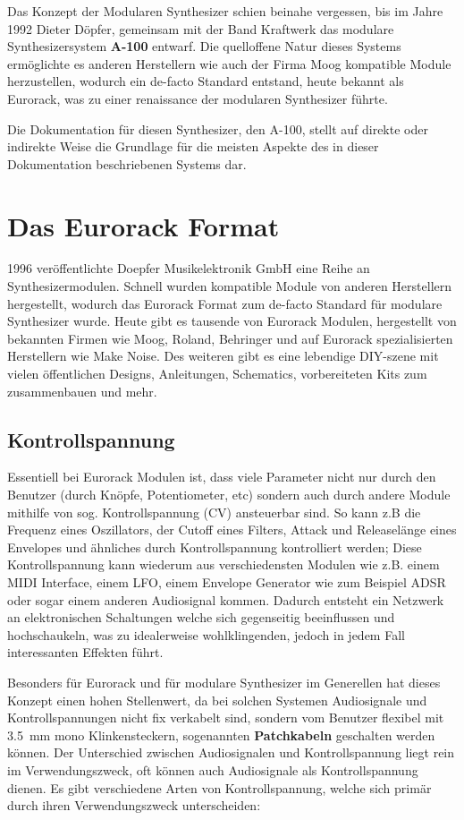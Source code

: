 Das Konzept der Modularen Synthesizer schien beinahe vergessen, bis im Jahre 1992 Dieter Döpfer, gemeinsam mit der Band Kraftwerk das modulare Synthesizersystem \textbf{A-100} entwarf. Die quelloffene Natur dieses Systems ermöglichte es anderen Herstellern wie auch der Firma Moog kompatible Module herzustellen, wodurch ein de-facto Standard entstand, heute bekannt als Eurorack, was zu einer renaissance der modularen Synthesizer führte.

Die Dokumentation für diesen Synthesizer, den A-100, stellt auf direkte oder indirekte Weise die Grundlage für die meisten Aspekte des in dieser Dokumentation beschriebenen Systems dar.

\section{Das Eurorack Format}
\label{sec:org2609a34}

1996 veröffentlichte Doepfer Musikelektronik GmbH eine Reihe an Synthesizermodulen. Schnell wurden kompatible Module von anderen Herstellern hergestellt, wodurch das Eurorack Format zum de-facto Standard für modulare Synthesizer wurde. Heute gibt es tausende von Eurorack Modulen, hergestellt von bekannten Firmen wie Moog, Roland, Behringer und auf Eurorack spezialisierten Herstellern wie Make Noise. Des weiteren gibt es eine lebendige DIY-szene mit vielen öffentlichen Designs, Anleitungen, Schematics, vorbereiteten Kits zum zusammenbauen und mehr.

\subsection{Kontrollspannung}
\label{sec:orgdd3cee6}
Essentiell bei Eurorack Modulen ist, dass viele Parameter nicht nur durch den Benutzer (durch Knöpfe, Potentiometer, etc) sondern auch durch andere Module mithilfe von sog. Kontrollspannung (CV) ansteuerbar sind. So kann z.B die Frequenz eines Oszillators, der Cutoff eines Filters, Attack und Releaselänge eines Envelopes und ähnliches durch Kontrollspannung kontrolliert werden; Diese Kontrollspannung kann wiederum aus verschiedensten Modulen wie z.B. einem MIDI Interface, einem LFO, einem Envelope Generator wie zum Beispiel ADSR oder sogar einem anderen Audiosignal kommen. Dadurch entsteht ein Netzwerk an elektronischen Schaltungen welche sich gegenseitig beeinflussen und hochschaukeln, was zu idealerweise wohlklingenden, jedoch in jedem Fall interessanten Effekten führt.

Besonders für Eurorack und für modulare Synthesizer im Generellen hat dieses Konzept einen hohen Stellenwert, da bei solchen Systemen Audiosignale und Kontrollspannungen nicht fix verkabelt sind, sondern vom Benutzer flexibel mit \SI{3.5}{\milli\meter} mono Klinkensteckern, sogenannten \textbf{Patchkabeln} geschalten werden können. Der Unterschied zwischen Audiosignalen und Kontrollspannung liegt rein im Verwendungszweck, oft können auch Audiosignale als Kontrollspannung dienen. Es gibt verschiedene Arten von Kontrollspannung, welche sich primär durch ihren Verwendungszweck unterscheiden:

